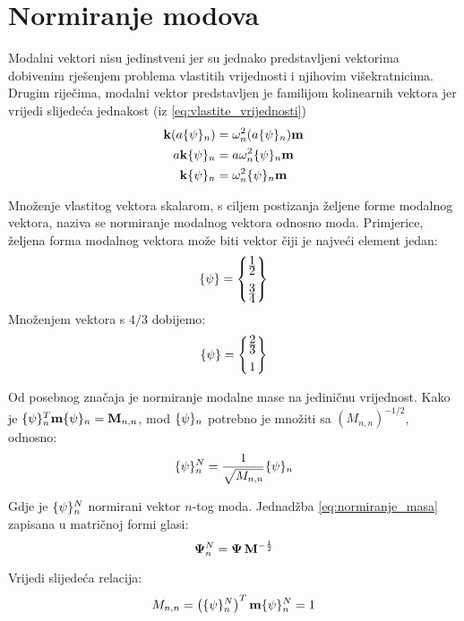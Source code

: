 \section{Normiranje modova}
Modalni vektori nisu jedinstveni jer su jednako predstavljeni vektorima dobivenim
rješenjem problema vlastitih vrijednosti i njihovim višekratnicima. Drugim riječima,
modalni vektor predstavljen je familijom kolinearnih vektora jer vrijedi slijedeća
jednakost (iz \eqref{eq:vlastite_vrijednosti})
\[
    \begin{aligned}
        \kk(a\vtor{\psi}{}_n)&=\omega_n^2(a\vtor{\psi}{}_n)\mm\\
        a\kk\vtor{\psi}{}_n&=a\omega_n^2\vtor{\psi}{}_n\mm\\
        \kk\vtor{\psi}{}_n&=\omega_n^2\vtor{\psi}{}_n\mm
    \end{aligned}
\]

Množenje vlastitog vektora skalarom, s ciljem postizanja željene forme modalnog
vektora, naziva se normiranje modalnog vektora odnosno moda. Primjerice, željena forma 
modalnog vektora može biti vektor čiji je najveći element jedan:
\[
    \vtor{\psi}{}=
        \begin{Bmatrix}
            \ffrac{1}{2}\\[8pt]
            \ffrac{3}{4}
        \end{Bmatrix}
\]
Množenjem vektora s $4/3$ dobijemo:
\[
    \vtor{\psi}{}=
        \begin{Bmatrix}
            \ffrac{2}{3}\\[6pt]
            1
        \end{Bmatrix}
\]

Od posebnog značaja je normiranje modalne mase na jediničnu vrijednost. Kako je
$\vtor{\psi}{}_n^T\mm\vtor{\psi}{}_n=\mathbf{M}_{n,n}$, mod $\vtor{\psi}{}_n$
potrebno je množiti sa $(M_{n,n})^{-1/2}$, odnosno:
\begin{equation}\label{eq:normiranje_masa}
    \vtor{\psi}{}_n^N=\frac{1}{\sqrt{M_{n,n}}}\vtor{\psi}{}_n
\end{equation}

Gdje je $\vtor{\psi}{}_n^N$ normirani vektor $n$-tog moda. Jednadžba
\eqref{eq:normiranje_masa} zapisana u matričnoj formi glasi:
\begin{equation}\label{eq:normiranje_masa_matricno}
    \mathbf{\Psi}_n^N=\mathbf{\Psi}\,\mathbf{M}^{-\frac{1}{2}}
\end{equation}

Vrijedi slijedeća relacija:
\begin{equation}\label{eq:relacija_normirani}
        M_{n,n}=\left(\vtor{\psi}{}_n^N\right)^T\mm\vtor{\psi}{}_n^N=1
\end{equation}

